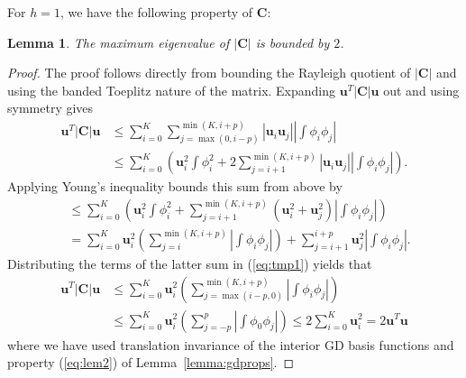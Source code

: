 \documentclass[preprint,10pt]{amsart}
\theoremstyle{lemma}
\newtheorem{lemma}{Lemma}
\theoremstyle{corollary}
\theoremstyle{theorem}
\newcommand{\LRp}[1]{\left( #1 \right)}
\newcommand{\LRb}[1]{\left| #1 \right|}
\begin{document}

For $h = 1$, we have the following property of $\bm{C}$:
\begin{lemma}
The maximum eigenvalue of $\LRb{\bm{C}}$ is bounded by $2$.
\label{lemma:Ceig}
\end{lemma}
\begin{proof}
The proof follows directly from bounding the Rayleigh quotient of $\LRb{\bm{C}}$ and using the banded Toeplitz nature of the matrix.  Expanding $\bm{u}^T\LRb{\bm{C}}\bm{u}$ out and using symmetry gives
\begin{align*}
\bm{u}^T\LRb{\bm{C}}\bm{u} &\leq \sum_{i=0}^K\sum_{j = \max(0,i-p)}^{\min(K,i+p)} \LRb{\bm{u}_i\bm{u}_j}\LRb{\int \phi_i\phi_j}\\
&\leq \sum_{i=0}^K \LRp{\bm{u}_i^2 \int\phi_i^2 + 2\sum_{j=i+1}^{\min(K,i+p)} \LRb{\bm{u}_i\bm{u}_j} \LRb{\int\phi_i\phi_j}}.
\end{align*}
Applying Young's inequality bounds this sum from above by
\begin{align}
&\leq\sum_{i=0}^K \LRp{\bm{u}_i^2 \int\phi_i^2 + \sum_{j=i+1}^{\min(K,i+p)} \LRp{\bm{u}_i^2 + \bm{u}_j^2} \LRb{\int\phi_i\phi_j}} \nonumber\\
&= \sum_{i=0}^K \bm{u}_i^2 \LRp{\sum_{j=i}^{\min(K,i+p)} \LRb{\int\phi_i\phi_{j}}} + \sum_{j=i+1}^{i+p} \bm{u}_j^2\LRb{\int \phi_i\phi_j}.\label{eq:tmp1}
\end{align}
Distributing the terms of the latter sum in (\ref{eq:tmp1}) yields that
\begin{align*}
\bm{u}^T\LRb{\bm{C}}\bm{u} &\leq \sum_{i=0}^K \bm{u}_i^2 \LRp{\sum_{j=\max(i-p,0)}^{\min(K,i+p)} \LRb{\int\phi_i\phi_{j}}}\\
&\leq  \sum_{i=0}^K \bm{u}_i^2\LRp{\sum_{j=-p}^{p} \LRb{\int\phi_0\phi_j}} \leq 2\sum_{i=0}^K \bm{u}_i^2  = 2\bm{u}^T\bm{u}
\end{align*}
where we have used translation invariance of the interior GD basis functions and property (\ref{eq:lem2}) of Lemma~\ref{lemma:gdprops}.
\end{proof}
\end{document}
